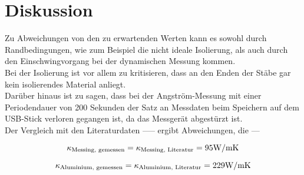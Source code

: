 \section{Diskussion}
\label{sec:Diskussion}

Zu Abweichungen von den zu erwartenden Werten kann es sowohl durch Randbedingungen, wie zum 
Beispiel die nicht ideale Isolierung, als auch durch den Einschwingvorgang bei der 
dynamischen Messung kommen. \\
Bei der Isolierung ist vor allem zu kritisieren, dass an den Enden der Stäbe gar kein 
isolierendes Material anliegt.\\

Darüber hinaus ist zu sagen, dass bei der Angström-Messung mit einer Periodendauer von 
200 Sekunden der Satz an Messdaten beim Speichern auf dem USB-Stick verloren gegangen ist, 
da das Messgerät abgestürzt ist.\\

Der Vergleich mit den Literaturdaten ----- ergibt Abweichungen, die ---

\begin{equation*}
    \kappa_{\textrm{Messing, gemessen}} =  \\
    \kappa_{\textrm{Messing, Literatur}} = 95 \textrm{W} / \textrm{mK}
\end{equation*}

\begin{equation*}
    \kappa_{\textrm{Aluminium, gemessen}} =  \\
    \kappa_{\textrm{Aluminium, Literatur}} = 229 \textrm{W} / \textrm{mK}
\end{equation*}


